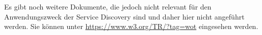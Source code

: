 Es gibt noch weitere Dokumente, die jedoch nicht relevant für den Anwendungszweck der Service Discovery sind und daher hier nicht angeführt werden. Sie können unter \url{https://www.w3.org/TR/?tag=wot} eingesehen werden.





